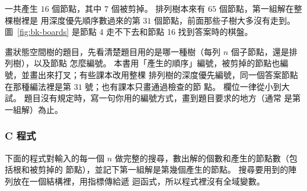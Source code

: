 一共產生 $16$ 個節點，其中 $7$ 個被剪掉。 排列樹本來有 $65$ 個節點，第一組解在整棵樹裡是
用深度優先順序數過來的第 $31$ 個節點，前面那些子樹大多沒有走到。 圖~\ref{fig:bk-boards}
是節點 4 走不下去和節點 16 找到答案時的棋盤。

\begin{center}
\label{fig:bk-boards}
\end{center}

\begin{examnote}
畫狀態空間樹的題目，先看清楚題目用的是哪一種樹（每列 $n$ 個子節點，還是排列樹），以及節點
怎麼編號。 本書用「產生的順序」編號，被剪掉的節點也編號，並畫出來打叉；有些課本改用整棵
排列樹的深度優先編號，同一個答案節點在那種編法裡是第 $31$ 號；也有課本只畫通過檢查的節
點。 欄位一律從小到大試。 題目沒有規定時，寫一句你用的編號方式，畫到題目要求的地方（通常
是第一組解）為止。
\end{examnote}

\subsubsection{C 程式}

下面的程式對輸入的每一個 $n$ 做完整的搜尋，數出解的個數和產生的節點數（包括根和被剪掉的
節點），並記下第一組解是第幾個產生的節點。 搜尋要用到的陣列放在一個結構裡，用指標傳給遞
迴函式，所以程式裡沒有全域變數。

